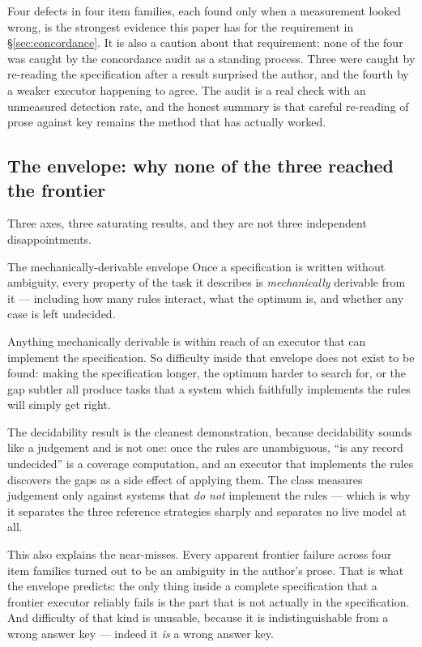 \documentclass[11pt]{article}
\theoremstyle{definition}
\begin{document}
Four defects in four item families, each found only when a measurement looked wrong, is the strongest evidence this paper has for the requirement in \S\ref{sec:concordance}. It is also a caution about that requirement: none of the four was caught by the concordance audit as a standing process. Three were caught by re-reading the specification after a result surprised the author, and the fourth by a weaker executor happening to agree. The audit is a real check with an unmeasured detection rate, and the honest summary is that careful re-reading of prose against key remains the method that has actually worked.

\subsection{The envelope: why none of the three reached the frontier}\label{sec:envelope}

Three axes, three saturating results, and they are not three independent disappointments.

\begin{claimbox}{The mechanically-derivable envelope}
Once a specification is written without ambiguity, every property of the task it describes is \emph{mechanically} derivable from it --- including how many rules interact, what the optimum is, and whether any case is left undecided.

Anything mechanically derivable is within reach of an executor that can implement the specification. So difficulty inside that envelope does not exist to be found: making the specification longer, the optimum harder to search for, or the gap subtler all produce tasks that a system which faithfully implements the rules will simply get right.
\end{claimbox}

The decidability result is the cleanest demonstration, because decidability sounds like a judgement and is not one: once the rules are unambiguous, ``is any record undecided'' is a coverage computation, and an executor that implements the rules discovers the gaps as a side effect of applying them. The class measures judgement only against systems that \emph{do not} implement the rules --- which is why it separates the three reference strategies sharply and separates no live model at all.

This also explains the near-misses. Every apparent frontier failure across four item families turned out to be an ambiguity in the author's prose. That is what the envelope predicts: the only thing inside a complete specification that a frontier executor reliably fails is the part that is not actually in the specification. And difficulty of that kind is unusable, because it is indistinguishable from a wrong answer key --- indeed it \emph{is} a wrong answer key.
\end{document}
